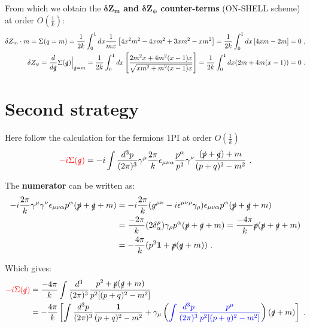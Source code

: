 \documentclass[a4paper,11pt,DIV=12]{scrartcl}
\begin{document}
From which we obtain the \textbf{$\mathbf{\delta Z_m}$ and $\mathbf{\delta Z_\psi}$ counter-terms} (ON-SHELL scheme) at order $O(\frac{1}{k})$:
\begin{align*}
    \delta Z_m \cdot m = \Sigma(q=m) = \frac{1}{2k}\int_0^1 dx \frac{1}{mx}\left[4x^2m^2-4xm^2+3xm^2-xm^2 \right]=\frac{1}{2k}\int_0^1 dx \left[4xm - 2m \right]=0\ , 
    \\
    \delta Z_\psi=\frac{d}{d \slashed{q}}\Sigma(\slashed{q})\Big|_{\slashed{q}=m}=\frac{1}{2k}\int_0^1 dx \left[ \frac{2m^2x+4m^2(x-1)x}{\sqrt{xm^2+m^2(x-1)x}} \right]=\frac{1}{2k}\int_0^1 dx (2m + 4m(x-1))= 0\ .
\end{align*}

\newpage

\section{Second strategy}

Here follow the calculation for the fermions 1PI at order $O(\frac{1}{k})$
\begin{equation}
    \textcolor{red} {-i \Sigma(\slashed{q})}=-i \int \frac{d^3 p}{(2\pi)^3}\gamma^\mu \frac{2\pi}{k} \epsilon_{\mu \nu \alpha} \frac{p^\alpha}{p^2}\gamma^\nu \frac{(\slashed{p}+\slashed{q})+m}{(p+q)^2-m^2}\ .
\end{equation}

The \textbf{numerator} can be written as:
\begin{align*}
    -i\frac{2\pi}{k} \gamma^\mu \gamma^\nu \epsilon_{\mu \nu \alpha}p^\alpha (\slashed{p}+\slashed{q}+m)&=-i \frac{2\pi}{k}(g^{\mu \nu}-i\epsilon^{\mu \nu \rho}\gamma_\rho)\epsilon_{\mu \nu \alpha}p^\alpha(\slashed{p}+\slashed{q}+m) 
    \\ &= \frac{-2\pi}{k}(2\delta^\rho_\alpha) \gamma_\rho p^\alpha (\slashed{p}+\slashed{q}+m) =\frac{-4\pi}{k}\slashed{p}(\slashed{p}+\slashed{q}+m)
    \\ &=-\frac{4\pi}{k}(p^2 \mathbf{1} + \slashed{p}(\slashed{q}+m))\ .
\end{align*}

Which gives:
\begin{align*}
   \textcolor{red} {-i \Sigma(\slashed{q})} &=\frac{-4\pi}{k} \int \frac{d^3}{(2\pi)^3} \frac{p^2 + \slashed{p}(\slashed{q}+m)}{p^2[(p+q)^2-m^2]}
    \\ &= -\frac{4 \pi}{k}\left[ \int \frac{d^3p}{(2\pi)^3} \frac{\mathbf{1}}{(p+q)^2-m^2} + \gamma_\mu \left( \textcolor{blue}{\int \frac{d^3p}{(2\pi)^3} \frac{p^\mu}{p^2 [(p+q)^2 - m^2]}} \right) (\slashed{q}+m)  \right]\ .
\end{align*}
\end{document}
